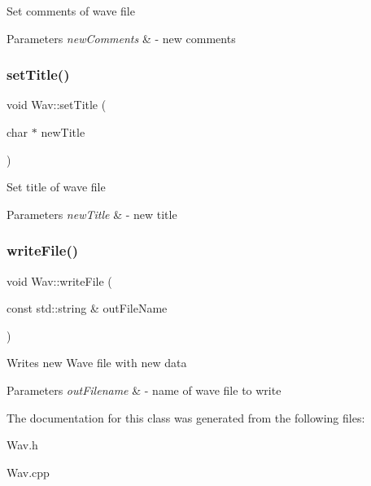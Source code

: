 Set comments of wave file 
\begin{DoxyParams}{Parameters}
{\em new\+Comments} & -\/ new comments \\
\hline
\end{DoxyParams}
\mbox{\label{classWav_a5a9ef59fd2c048b07af46e47b8b62a76}} 
\subsubsection{\texorpdfstring{set\+Title()}{setTitle()}}
{\footnotesize\ttfamily void Wav\+::set\+Title (\begin{DoxyParamCaption}\item[{char $\ast$}]{new\+Title }\end{DoxyParamCaption})}

Set title of wave file 
\begin{DoxyParams}{Parameters}
{\em new\+Title} & -\/ new title \\
\hline
\end{DoxyParams}
\mbox{\label{classWav_ad86f4a21d36719ae375ea2586f9f591f}} 
\subsubsection{\texorpdfstring{write\+File()}{writeFile()}}
{\footnotesize\ttfamily void Wav\+::write\+File (\begin{DoxyParamCaption}\item[{const std\+::string \&}]{out\+File\+Name }\end{DoxyParamCaption})}

Writes new Wave file with new data 
\begin{DoxyParams}{Parameters}
{\em out\+Filename} & -\/ name of wave file to write \\
\hline
\end{DoxyParams}


The documentation for this class was generated from the following files\+:\begin{DoxyCompactItemize}
\item 
Wav.\+h\item 
Wav.\+cpp\end{DoxyCompactItemize}
